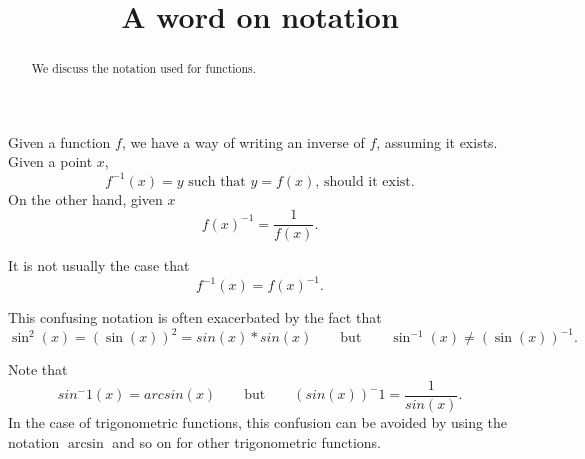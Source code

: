 \documentclass{ximera}
\title{A word on notation}
\begin{document}
\begin{abstract}
  We discuss the notation used for functions.
\end{abstract}
\maketitle

Given a function $f$, we have a way of writing an inverse of $f$,
assuming it exists. Given a point $x$, 
\[
f^{-1}(x) = \text{$y$ such that $y = f(x)$, should it exist.}
\]
On the other hand, given $x$
\[
f(x)^{-1} = \frac{1}{f(x)}.
\]
\begin{warning}
It is not usually the case that 
\[
f^{-1}(x) = f(x)^{-1}.
\]
\end{warning}

This confusing notation is often exacerbated by the fact that 
\[
\sin^2(x) = (\sin(x))^2=sin(x)*sin(x)\qquad \text{but} \qquad \sin^{-1}(x)
\ne(\sin(x))^{-1}.
\]

\begin{warning}
  Note that 
  \[
  sin^-1(x)=arcsin(x)\qquad\text{but}\qquad (sin(x))^-1 = \frac
  {1}{sin(x)}.
  \]
  In the case of trigonometric functions, this confusion can be avoided
  by using the notation $\arcsin$ and so on for other trigonometric
  functions.
\end{warning}
\end{document}
